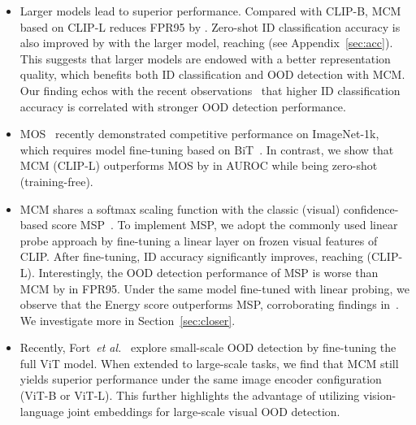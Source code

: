 \documentclass{article}
\def\etal{\emph{et al.}}
\begin{document}
\begin{itemize}[leftmargin=*,topsep=4pt,itemsep=4pt,parsep=0pt]
    \item Larger models lead to superior performance. Compared with CLIP-B, MCM based on CLIP-L reduces FPR95 by . Zero-shot ID classification accuracy is also improved by  with the larger model, reaching  (see Appendix~\ref{sec:acc}).  This suggests that larger models are endowed with a better representation quality, which benefits both ID classification and OOD detection with MCM. Our finding echos with the recent observations~\cite{vaze2021open} that higher ID classification accuracy is correlated with stronger OOD detection performance.
    \item  MOS~\cite{huang2021mos} recently demonstrated competitive performance on ImageNet-1k, which requires model fine-tuning based on BiT~\cite{kolesnikov2020big}. In contrast, we show that MCM (CLIP-L) outperforms MOS by  in AUROC while being zero-shot (training-free).
    \item MCM shares a softmax scaling function with the classic (visual) confidence-based score MSP~\cite{hendrycks2016baseline}. To implement MSP, we adopt the commonly used linear probe approach by fine-tuning a linear layer on frozen visual features of CLIP. After fine-tuning, ID accuracy significantly improves, reaching  (CLIP-L). Interestingly, the OOD detection performance of MSP is worse than MCM by  in FPR95. Under the same model fine-tuned with linear probing, we observe that the Energy score outperforms MSP, corroborating findings in~\cite{liu2020energy}. We investigate more in Section~\ref{sec:closer}. 
    \item Recently,  Fort~\etal~\cite{fort2021exploring} explore small-scale OOD detection by fine-tuning the full ViT model. When extended to large-scale tasks, we find that MCM still yields superior performance under the same image encoder configuration (ViT-B or ViT-L). This further highlights the advantage of utilizing vision-language joint embeddings for large-scale visual OOD detection.
\end{itemize}
\end{document}

